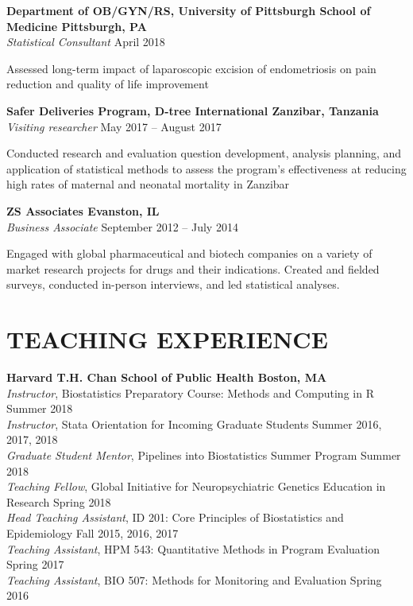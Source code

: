 \documentclass[12pt]{article}
\begin{document}
\textbf{Department of OB/GYN/RS, University of Pittsburgh School of Medicine \hfill \hfill Pittsburgh, PA}  \\
\textit{ Statistical Consultant} \hfill \hfill April 2018
\begin{addmargin}[1em]{2em} {\small Assessed long-term impact of laparoscopic excision of endometriosis on pain reduction and quality of life improvement} \\ \end{addmargin} 

\textbf{Safer Deliveries Program, D-tree International \hfill \hfill Zanzibar, Tanzania} \\
\textit{Visiting researcher} \hfill \hfill May 2017 -- August 2017 
\begin{addmargin}[1em]{2em} {\small Conducted research and evaluation question development, analysis planning, and application of statistical methods to assess the program's effectiveness at reducing high rates of maternal and neonatal mortality in Zanzibar} \\ \end{addmargin} 

\textbf{ZS Associates \hfill \hfill Evanston, IL} \\
\textit{Business Associate} \hfill \hfill September 2012 -- July 2014
\begin{addmargin}[1em]{2em} 
	{\small Engaged with global pharmaceutical and biotech companies on a variety of market research projects for drugs and their indications. Created and fielded surveys, conducted in-person interviews, and led statistical analyses.}
\end{addmargin}

\vspace{-.1cm}
\section*{\textbf{{\large T}{EACHING} {\large E}{XPERIENCE}}}
\textbf{Harvard T.H. Chan School of Public Health \hfill \hfill Boston, MA} \\
\textit{Instructor}, Biostatistics Preparatory Course: Methods and Computing in R \hfill \hfill Summer 2018 \\
\textit{Instructor}, Stata Orientation for Incoming Graduate Students \hfill \hfill	Summer 2016, 2017, 2018\\
\textit{Graduate Student Mentor}, Pipelines into Biostatistics Summer Program \hfill \hfill Summer 2018 \\
\textit{Teaching Fellow}, Global Initiative for Neuropsychiatric Genetics Education in Research \hfill \hfill Spring 2018 \\
\textit{Head Teaching Assistant}, ID 201: Core Principles of Biostatistics and Epidemiology \hfill \hfill Fall 2015, 2016, 2017 \\
\textit{Teaching Assistant}, HPM 543: Quantitative Methods in Program Evaluation \hfill \hfill Spring 2017 \\
\textit{Teaching Assistant}, BIO 507: Methods for Monitoring and Evaluation \hfill \hfill Spring 2016 \\
\end{document}
